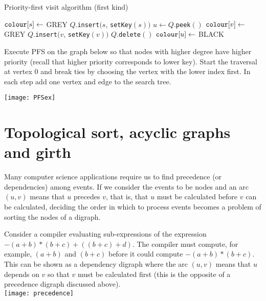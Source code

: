 \begin{algorithm}[H]
  \caption{Priority-first visit algorithm (first kind)}
  \label{alg:PFScodeVisit}
  \begin{algorithmic}[1]
	\State $\operatorname{\text{\texttt{colour}}}[s] \gets $ GREY 
	\State $Q$.\texttt{insert}$(s$, \texttt{setKey}$(s))$
		\State $u \gets Q$.\texttt{peek}$()$
			\State $\operatorname{\text{\texttt{colour}}}[v] \gets $ GREY
			\State $Q$.\texttt{insert}$(v$, \texttt{setKey}$(v))$
		\Else
			\State $Q$.\texttt{delete}$()$
			\State $\operatorname{\text{\texttt{colour}}}[u] \gets$ BLACK
		\EndIf
	\EndWhile
\EndFunction
\end{algorithmic}
\end{algorithm}

\begin{Boxample}
Execute PFS on the graph below so that nodes with higher degree have higher priority (recall that higher priority corresponds to lower key). 
Start the traversal at vertex 0 and break ties by choosing the vertex with the lower index first.
In each step add one vertex and edge to the search tree. 
\begin{center}
  \texttt{[image: PFSex]}
\end{center}
\end{Boxample}

\chapter{Topological sort, acyclic graphs and girth} %
Many computer science applications require us to find precedence (or dependencies) among events. 
If we consider the events to be nodes and an arc $(u,v)$ means that $u$ precedes $v$, that is, 
that $u$ must be calculated before $v$ can be calculated, 
deciding the order in which to process events becomes a problem of sorting the nodes of a digraph.

\begin{Boxample}[0]
Consider a compiler evaluating sub-expressions of the expression $-(a+b) * (b+c) + ((b+c)+d)$.  
The compiler must compute, for example, $(a+b)$ and $(b+c)$ before it could compute $-(a+b) * (b+c)$. 
This can be shown as a dependency digraph where the arc $(u,v)$ means 
that $u$ depends on $v$ so that $v$ must be calculated first (this is the opposite of a precedence digraph discussed above).\\
\texttt{[image: precedence]}
\end{Boxample}

